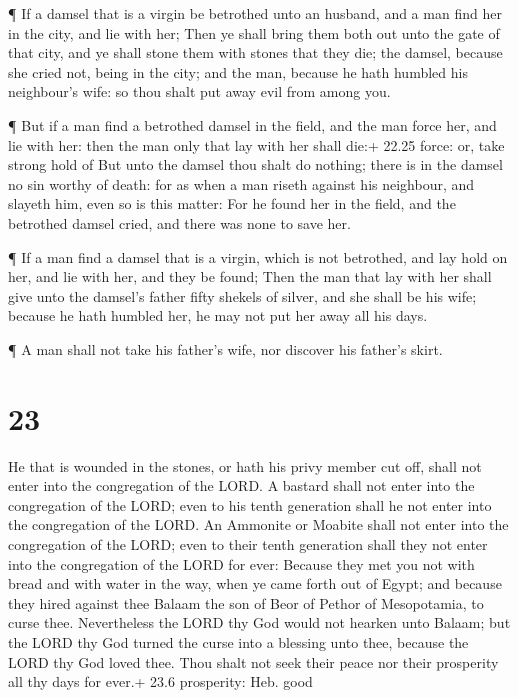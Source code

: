  ¶ If a damsel that is a virgin be betrothed unto an
husband, and a man find her in the city, and lie with her; 
Then ye shall bring them both out unto the gate of that city, and ye
shall stone them with stones that they die; the damsel, because she
cried not, being in the city; and the man, because he hath humbled his
neighbour's wife: so thou shalt put away evil from among you.

 ¶ But if a man find a betrothed damsel in the field, and
the man force her, and lie with her: then the man only that lay with her
shall die:+ 22.25 force: or, take strong hold of  But unto
the damsel thou shalt do nothing; there is in the damsel no sin worthy
of death: for as when a man riseth against his neighbour, and slayeth
him, even so is this matter:  For he found her in the
field, and the betrothed damsel cried, and there was none to save her.

 ¶ If a man find a damsel that is a virgin, which is not
betrothed, and lay hold on her, and lie with her, and they be found;
 Then the man that lay with her shall give unto the
damsel's father fifty shekels of silver, and she shall be his wife;
because he hath humbled her, he may not put her away all his days.

 ¶ A man shall not take his father's wife, nor discover his
father's skirt.

\hypertarget{section-22}{%
\section{23}\label{section-22}}

 He that is wounded in the stones, or hath his privy member
cut off, shall not enter into the congregation of the LORD. 
A bastard shall not enter into the congregation of the LORD; even to his
tenth generation shall he not enter into the congregation of the LORD.
 An Ammonite or Moabite shall not enter into the
congregation of the LORD; even to their tenth generation shall they not
enter into the congregation of the LORD for ever:  Because
they met you not with bread and with water in the way, when ye came
forth out of Egypt; and because they hired against thee Balaam the son
of Beor of Pethor of Mesopotamia, to curse thee. 
Nevertheless the LORD thy God would not hearken unto Balaam; but the
LORD thy God turned the curse into a blessing unto thee, because the
LORD thy God loved thee.  Thou shalt not seek their peace
nor their prosperity all thy days for ever.+ 23.6 prosperity: Heb. good


